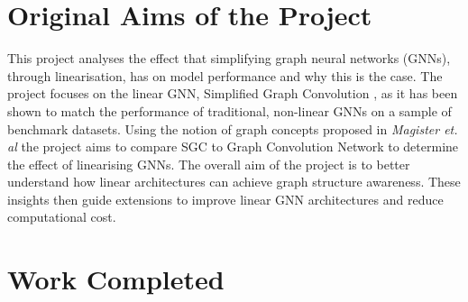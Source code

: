 \documentclass[12pt,a4paper,openany,openright]{report}
\begin{document}

\section*{Original Aims of the Project}

This project analyses the effect that simplifying graph neural networks (GNNs), through linearisation, has on model performance and why this is the case.
The project focuses on the linear GNN, Simplified Graph Convolution \cite{wu2019simplifying}, as it has been shown to match the performance of traditional, non-linear GNNs on a sample of benchmark datasets.
Using the notion of graph concepts proposed in \textit{Magister et. al} \cite{magister2021gcexplainer} the project aims to compare SGC to Graph Convolution Network to determine the effect of linearising GNNs.
The overall aim of the project is to better understand how linear architectures can achieve graph structure awareness.
These insights then guide extensions to improve linear GNN architectures and reduce computational cost.

\section*{Work Completed}
\end{document}
